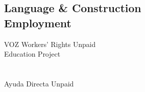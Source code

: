 \documentclass[margin,line]{resume}
\begin{document}
\begin{resume}
	\section{\mysidestyle Language \& Construction \\ Employment}
VOZ Workers' Rights \hfill Unpaid \\ Education Project \hfill  \\ \\
\vspace{-2mm}\\    
Ayuda Directa  \hfill Unpaid \\    

\end{resume}
\end{document}
